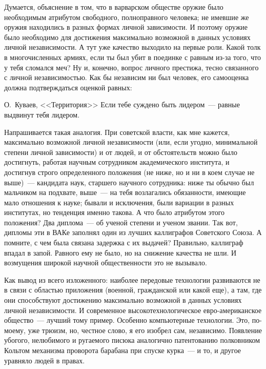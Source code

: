 Думается, объяснение в том, что в варварском обществе оружие было необходимым атрибутом свободного, полноправного человека; не имевшие же оружия находились в разных формах личной зависимости. И поэтому оружие было необходимо для достижения максимально возможной в данных условиях личной независимости. А тут уже качество выходило на первые роли. Какой толк в многочисленных армиях, если ты был убит в поединке с равным из-за того, что у тебя сломался меч? Ну и, конечно, вопрос личного престижа, тесно связанного с личной независимостью. Как бы независим ни был человек, его самооценка должна подтверждаться оценкой равных:

\begin{shadequote}[r]{О.~Куваев, <<Территория>>}
Если тебе суждено быть лидером~--- равные выдвинут тебя лидером.
\end{shadequote}

Напрашивается такая аналогия. При советской власти, как мне кажется, максимально возможной личной независимости (или, если угодно, минимальной степени личной зависимости) и от людей, и от обстоятельств можно было достигнуть, работая научным сотрудником академического института, и достигнув строго определенного положения (не ниже, но и ни в коем случае не выше)~--- кандидата наук, старшего научного сотрудника: ниже ты обычно был мальчиком на подхвате, выше~--- на тебя возлагались обязанности, имеющие мало отношения к науке; бывали и исключения, были вариации в разных институтах, но тенденция именно такова. А что было атрибутом этого положения? Два диплома~--- об ученой степени и ученом звании. Так вот, дипломы эти в ВАКе заполнял один из лучших каллиграфов Советского Союза. А помните, с чем была связана задержка с их выдачей? Правильно, каллиграф впадал в запой. Равного ему не было, но на снижение качества не шли. И возмущения широкой научной общественности это не вызывало. 

Как вывод из всего изложенного: наиболее передовые технологии развиваются не в связи с областью приложения (военной, гражданской или какой еще), а там, где они способствуют достижению максимально возможной в данных условиях личной независимости. И современное высокотехнологическое евро-американское общество~--- лучший тому пример. Особенно компьютерные технологии. Это, по-моему, уже трюизм, но, честное слово, я его изобрел сам, независимо. Появление убогого, нелюбимого и ругаемого писюка аналогично патентованию полковником Кольтом механизма проворота барабана при спуске курка~--- и то, и другое уравняло людей в правах. 

